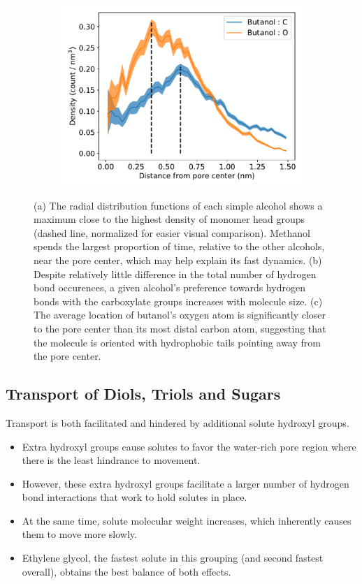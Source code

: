 \documentclass{article}
\begin{document}
\begin{figure}
\begin{subfigure}{0.325\textwidth}
  \includegraphics[width=\linewidth]{butanol_CO.pdf}  %
  \caption{}\label{fig:butanol_CO}
  \end{subfigure}
  \caption{(a) The radial distribution functions of each simple alcohol shows a maximum close
  to the highest density of monomer head groups (dashed line, normalized for easier visual
  comparison). Methanol spends the largest proportion of time, relative to the other alcohols,
  near the pore center, which may help explain its fast dynamics. (b) Despite relatively little
  difference in the total number of hydrogen bond occurences, a given alcohol's preference
  towards hydrogen bonds with the carboxylate groups increases with molecule size. (c) The average
  location of butanol's oxygen atom is significantly closer to the pore center than its most distal
  carbon atom, suggesting that the molecule is oriented with hydrophobic tails pointing away from
  the pore center.}\label{fig:simple_alcohols}
  \end{figure}

  \subsection*{Transport of Diols, Triols and Sugars}  %
  
  Transport is both facilitated and hindered by additional solute hydroxyl groups.
  \begin{itemize}
    \item Extra hydroxyl groups cause solutes to favor the water-rich pore region
    where there is the least hindrance to movement.
    \item However, these extra hydroxyl groups facilitate a larger number of 
    hydrogen bond interactions that work to hold solutes in place.
    \item At the same time, solute molecular weight increases, which inherently
    causes them to move more slowly.
    \item Ethylene glycol, the fastest solute in this grouping (and second fastest
    overall), obtains the best balance of both effects.
  \end{itemize}
  
\end{document}
